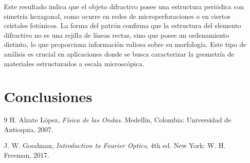 \documentclass[6pt,a4paper]{article}
\begin{document}
Este resultado indica que el objeto difractivo posee una estructura periódica con simetría hexagonal, como ocurre en redes de microperforaciones o en ciertos cristales fotónicos. La forma del patrón confirma que la estructura del elemento difractivo no es una rejilla de líneas rectas, sino que posee un ordenamiento distinto, lo que proporciona información valiosa sobre su morfología. Este tipo de análisis es crucial en aplicaciones donde se busca caracterizar la geometría de materiales estructurados a escala microscópica.

\section{Conclusiones}

\begin{thebibliography}{9}
    H. Alzate López, \textit{Física de las Ondas}. Medellín, Colombia: Universidad de Antioquia, 2007.
    
    J. W. Goodman, \textit{Introduction to Fourier Optics}, 4th ed. New York: W. H. Freeman, 2017.
\end{thebibliography}
\end{document}

